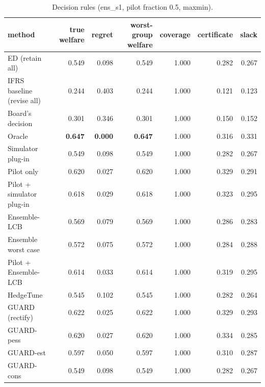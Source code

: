\begin{table}[t]
\centering
\small
\begin{tabular}{lrrrrrr}
\toprule
method & true welfare & regret & worst-group welfare & coverage & certificate & slack \\
\midrule
ED (retain all) & 0.549 & 0.098 & 0.549 & 1.000 & 0.282 & 0.267 \\
IFRS baseline (revise all) & 0.244 & 0.403 & 0.244 & 1.000 & 0.121 & 0.123 \\
Board's decision & 0.301 & 0.346 & 0.301 & 1.000 & 0.150 & 0.152 \\
Oracle & \textbf{0.647} & \textbf{0.000} & \textbf{0.647} & 1.000 & 0.316 & 0.331 \\
Simulator plug-in & 0.549 & 0.098 & 0.549 & 1.000 & 0.282 & 0.267 \\
Pilot only & 0.620 & 0.027 & 0.620 & 1.000 & 0.329 & 0.291 \\
Pilot + simulator plug-in & 0.618 & 0.029 & 0.618 & 1.000 & 0.323 & 0.295 \\
Ensemble-LCB & 0.569 & 0.079 & 0.569 & 1.000 & 0.286 & 0.283 \\
Ensemble worst case & 0.572 & 0.075 & 0.572 & 1.000 & 0.284 & 0.288 \\
Pilot + Ensemble-LCB & 0.614 & 0.033 & 0.614 & 1.000 & 0.319 & 0.295 \\
HedgeTune & 0.545 & 0.102 & 0.545 & 1.000 & 0.282 & 0.264 \\
GUARD (rectify) & 0.622 & 0.025 & 0.622 & 1.000 & 0.329 & 0.293 \\
GUARD-pess & 0.620 & 0.027 & 0.620 & 1.000 & 0.334 & 0.285 \\
GUARD-est & 0.597 & 0.050 & 0.597 & 1.000 & 0.310 & 0.287 \\
GUARD-cons & 0.549 & 0.098 & 0.549 & 1.000 & 0.282 & 0.267 \\
\bottomrule
\end{tabular}
\caption{Decision rules (ens\_s1, pilot fraction 0.5, maxmin).}
\label{tab:methods-maxmin}
\end{table}

